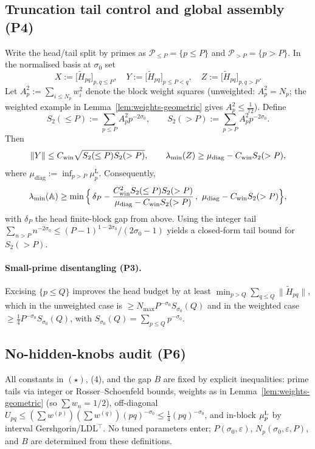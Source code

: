 \documentclass[11pt]{article}
\theoremstyle{definition}
\theoremstyle{remark}
\theoremstyle{definition}
\begin{document}
\subsection*{Truncation tail control and global assembly (P4)}
Write the head/tail split by primes as $\mathcal P_{\le P}=\{p\le P\}$ and $\mathcal P_{>P}=\{p>P\}$. In the normalised basis at $\sigma_0$ set
\[ X:=\bigl[\widetilde H_{pq}\bigr]_{p,q\le P},\quad Y:=\bigl[\widetilde H_{pq}\bigr]_{p\le P<q},\quad Z:=\bigl[\widetilde H_{pq}\bigr]_{p,q>P}. \]
Let $A_p^2:=\sum_{i\le N_p} w_i^2$ denote the block weight squares (unweighted: $A_p^2=N_p$; the weighted example in Lemma~\ref{lem:weights-geometric} gives $A_p^2\le\tfrac1{72}$). Define
\[ S_2(\le P):=\sum_{p\le P} A_p^2 p^{-2\sigma_0},\qquad S_2(>P):=\sum_{p>P} A_p^2 p^{-2\sigma_0}. \]
Then
\[ \|Y\|\le C_{\rm win}\sqrt{S_2(\le P)S_2(>P)},\qquad \lambda_{\min}(Z)\ge \mu_{\mathrm{diag}}-C_{\rm win}S_2(>P), \]
where $\mu_{\mathrm{diag}}:=\inf_{p>P}\mu_p^{\mathrm L}$. Consequently,
\[ \lambda_{\min}(\mathbb A)\ge \min\Big\{\,\delta_P - \dfrac{C_{\rm win}^2 S_2(\le P)S_2(>P)}{\mu_{\mathrm{diag}}-C_{\rm win}S_2(>P)}\,,\ \mu_{\mathrm{diag}}-C_{\rm win}S_2(>P)\Big\}, \]
with $\delta_P$ the head finite-block gap from above. Using the integer tail $\sum_{n>P}n^{-2\sigma_0}\le (P-1)^{1-2\sigma_0}/(2\sigma_0-1)$ yields a closed-form tail bound for $S_2(>P)$.
\paragraph{Small-prime disentangling (P3).}
Excising $\{p\le Q\}$ improves the head budget by at least $\min_{p>Q}\sum_{q\le Q}\|\widetilde H_{pq}\|$, which in the unweighted case is $\ge N_{\max} P^{-\sigma_0} S_{\sigma_0}(Q)$ and in the weighted case $\ge \tfrac14 P^{-\sigma_0} S_{\sigma_0}(Q)$, with $S_{\sigma_0}(Q)=\sum_{p\le Q}p^{-\sigma_0}$.

\subsection*{No-hidden-knobs audit (P6)}
All constants in $(\star)$, (4), and the gap $B$ are fixed by explicit inequalities: prime tails via integer or Rosser--Schoenfeld bounds, weights as in Lemma~\ref{lem:weights-geometric} (so $\sum w_n=1/2$), off-diagonal $U_{pq}\le (\sum w^{(p)})(\sum w^{(q)})(pq)^{-\sigma_0}\le \tfrac14 (pq)^{-\sigma_0}$, and in-block $\mu_p^{\rm L}$ by interval Gershgorin/LDL$^\top$. No tuned parameters enter; $P(\sigma_0,\varepsilon)$, $N_p(\sigma_0,\varepsilon,P)$, and $B$ are determined from these definitions.
\end{document}
